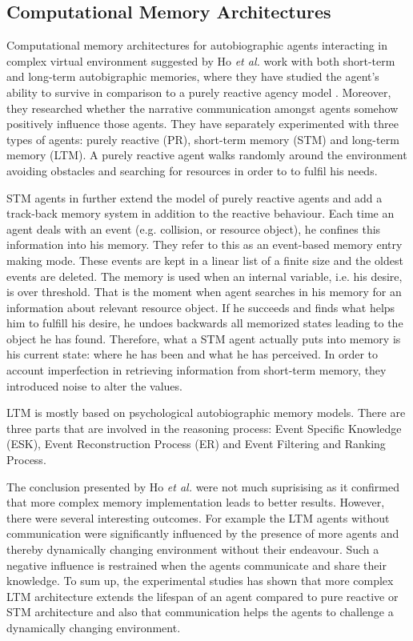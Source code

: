 \subsection{Computational Memory Architectures}

Computational memory architectures for autobiographic agents interacting in complex virtual environment suggested by Ho \textit{et al.} work with both short-term and long-term autobigraphic memories, where they have studied the agent’s ability to survive in comparison to a purely reactive agency model \cite{Ho:memoryarchitectures}. Moreover, they researched whether the narrative communication amongst agents somehow positively influence those agents. They have separately experimented with three types of agents: purely reactive (PR), short-term memory (STM) and long-term memory (LTM). A purely reactive agent walks randomly around the environment avoiding obstacles and searching for resources in order to to fulfil his needs.

STM agents in further extend the model of purely reactive agents and add a track-back memory system in addition to the reactive behaviour. Each time an agent deals with an event (e.g. collision, or resource object), he confines this information into his memory. They refer to this as an event-based memory entry making mode. These events are kept in a linear list of a finite size and the oldest events are deleted. The memory is used when an internal variable, i.e. his desire, is over threshold. That is the moment when agent searches in his memory for an information about relevant resource object. If he succeeds and finds what helps him to fulfill his desire, he undoes backwards all memorized states leading to the object he has found. Therefore, what a STM agent actually puts into memory is his current state: where he has been and what he has perceived. In order to account imperfection in retrieving information from short-term memory, they introduced noise to alter the values.

LTM is mostly based on psychological autobiographic memory models. There are three parts that are involved in the reasoning process: Event Specific Knowledge (ESK), Event Reconstruction Process (ER) and Event Filtering and Ranking Process.

The conclusion presented by Ho \textit{et al.} were not much suprisising as it confirmed that more complex memory implementation leads to better results. However, there were several interesting outcomes. For example the LTM agents without communication were significantly influenced by the presence of more agents and thereby dynamically changing environment without their endeavour. Such a negative influence is restrained when the agents communicate and share their knowledge. To sum up, the experimental studies has shown that more complex LTM architecture extends the lifespan of an agent compared to pure reactive or STM architecture and also that communication helps the agents to challenge a dynamically changing environment. 

